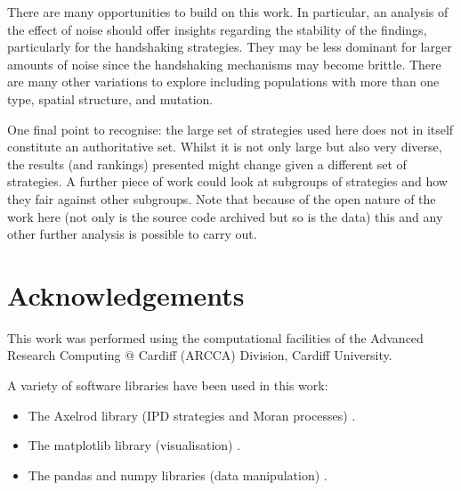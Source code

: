 \documentclass[10pt,letterpaper]{article}
\begin{document}
There are many opportunities to build on this work. In particular, an analysis
of the effect of noise should offer insights regarding the stability of the findings,
particularly for the handshaking strategies. They may be less dominant for
larger amounts of noise since the handshaking mechanisms may become brittle.
There are many other variations to explore including populations with more
than one type, spatial structure, and mutation.

One final point to recognise: the large set of strategies used here does not in
itself constitute an authoritative set. Whilst it is not only large but also very
diverse, the results (and rankings) presented might change given a different set
of strategies. A further piece of work could look at subgroups of strategies and
how they fair against other subgroups. Note that because of the open nature of
the work here (not only is the source code archived but so is the data) this and
any other further analysis is possible to carry out.


\section*{Acknowledgements}

This work was performed using the computational facilities of the Advanced
Research Computing @ Cardiff (ARCCA) Division, Cardiff University.

A variety of software libraries have been used in this work:

\begin{itemize}
    \item The Axelrod library (IPD strategies and Moran processes)
        \cite{axelrodproject}.
    \item The matplotlib library (visualisation) \cite{hunter2007matplotlib}.
    \item The pandas and numpy libraries (data manipulation)
        \cite{mckinney2010data, walt2011numpy}.
\end{itemize}

\nolinenumbers
\end{document}
